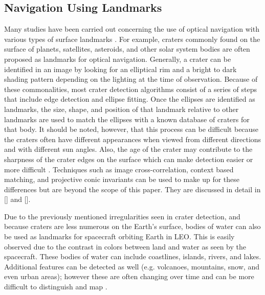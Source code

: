 \documentclass[]{aiaa-tc}%
\begin{document}
\subsection{Navigation Using Landmarks}
Many studies have been carried out concerning the use of optical navigation with various types of surface landmarks \cite{Cheng:2003,Rowell:2013,Hanak,Rohr:2011,Cheng:2003b}.  For example, craters commonly found on the surface of planets, satellites, asteroids, and other solar system bodies are often proposed as landmarks for optical navigation.  Generally, a crater can be identified in an image by looking for an elliptical rim and a bright to dark shading pattern depending on the lighting at the time of observation.  Because of these commonalities, most crater detection algorithms consist of a series of steps that include edge detection and ellipse fitting.  Once the ellipses are identified as landmarks, the size, shape, and position of that landmark relative to other landmarks are used to match the ellipses with a known database of craters for that body\cite{Hanak}.  It should be noted, however, that this process can be difficult because the craters often have different appearances when viewed from different directions and with different sun angles.  Also, the age of the crater may contribute to the sharpness of the crater edges on the surface which can make detection easier or more difficult \cite{Cheng:2003}. Techniques such as image cross-correlation, context based matching, and projective conic invariants can be used to make up for these differences but are beyond the scope of this paper. They are discussed in detail in [] and [].

Due to the previously mentioned irregularities seen in crater detection, and because craters are less numerous on the Earth's surface, bodies of water can also be used as landmarks for spacecraft orbiting Earth in LEO.  This is easily observed due to the contrast in colors between land and water as seen by the spacecraft.  These bodies of water can include coastlines, islands, rivers, and lakes.  Additional features can be detected as well (e.g. volcanoes, mountains, snow, and even urban areas); however these are often changing over time and can be more difficult to distinguish and map \cite{SeenFromSpace}.

\end{document}
